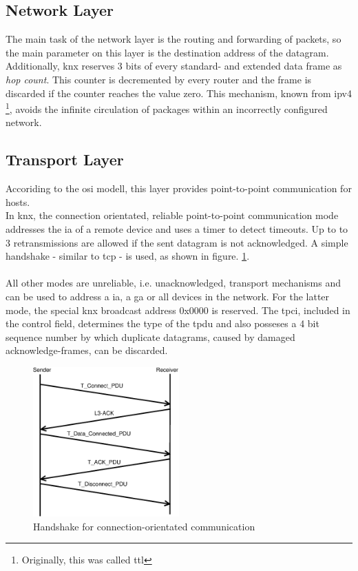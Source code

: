 \subsection{Network Layer}

The main task of the network layer is the routing and forwarding of packets, so the main parameter on this layer is the destination address of the
datagram. Additionally, \gls{knx} reserves 3 bits of every standard- and extended data frame as
\textit{hop count}. This counter is decremented by every router and the frame is discarded if the counter reaches the value zero. This mechanism, known from
\gls{ipv4} \cite{rfc791} \footnote{Originally, this was called \gls{ttl}}, avoids the infinite circulation of packages within an incorrectly configured network.

\subsection{Transport Layer}

Accoriding to the \gls{osi} modell, this layer provides point-to-point communication for hosts.
\\
In \gls{knx}, the connection orientated, reliable point-to-point communication mode addresses the \gls{ia} of a remote device and uses a timer to detect timeouts.
Up to to 3 retransmissions are allowed if the sent datagram is not acknowledged. A simple handshake - similar to \gls{tcp} - is used, as shown in figure. 
\ref{fig:handshake}.
\\
\\
All other modes are unreliable, i.e. unacknowledged, transport mechanisms and can be used to address a \gls{ia}, a \gls{ga} or all devices in the
network. For the latter mode, the special \gls{knx} broadcast address 0x0000 is reserved. 
The \gls{tpci}, included in the control field, determines the type of the \gls{tpdu} and also posseses a 4 bit sequence number by which duplicate datagrams, caused by damaged 
acknowledge-frames, can be discarded.

 \begin{figure}
    \centering
    \includegraphics[width=0.5\textwidth]{figures/TransportHandshake.eps}
    \caption{Handshake for connection-orientated communication}
    \label{fig:handshake}
\end{figure}
 
